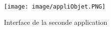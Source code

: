 \begin{figure}[!h]
  \begin{center}
    \texttt{[image: image/appliObjet.PNG]}
    \caption{Interface de la seconde application}
  \end{center}
\end{figure}
